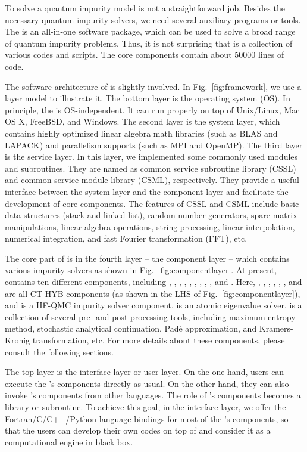 To solve a quantum impurity model is not a straightforward job. Besides the necessary quantum impurity solvers, we need several auxiliary programs or tools. The {\iqist} is an all-in-one software package, which can be used to solve a broad range of quantum impurity problems. Thus, it is not surprising that {\iqist} is a collection of various codes and scripts. The core components contain about 50000 lines of code. 

The software architecture of {\iqist} is slightly involved. In Fig.~\ref{fig:framework}, we use a layer model to illustrate it. The bottom layer is the operating system (OS). In principle, the {\iqist} is OS-independent. It can run properly on top of Unix/Linux, Mac OS X, FreeBSD, and Windows. The second layer is the system layer, which contains highly optimized linear algebra math libraries (such as BLAS and LAPACK) and parallelism supports (such as MPI and OpenMP). The third layer is the service layer. In this layer, we implemented some commonly used modules and subroutines. They are named as common service subroutine library (CSSL) and common service module library (CSML), respectively. They provide a useful interface between the system layer and the component layer and facilitate the development of core components. The features of CSSL and CSML include basic data structures (stack and linked list), random number generators, spare matrix manipulations, linear algebra operations, string processing, linear interpolation, numerical integration, and fast Fourier transformation (FFT), etc. 

The core part of {\iqist} is in the fourth layer -- the component layer -- which contains various impurity solvers as shown in Fig.~\ref{fig:componentlayer}. At present, {\iqist} contains ten different components, including {\azalea}, {\gardenia}, {\narcissus}, {\begonia}, {\lavender}, {\pansy}, {\manjushaka}, {\daisy}, {\jasmine}, and {\hibiscus}. Here, {\azalea}, {\gardenia}, {\narcissus}, {\begonia}, {\lavender}, {\pansy}, and {\manjushaka} are all CT-HYB components (as shown in the LHS of Fig.~\ref{fig:componentlayer}), and {\daisy} is a HF-QMC impurity solver component. {\jasmine} is an atomic eigenvalue solver. {\hibiscus} is a collection of several pre- and post-processing tools, including maximum entropy method, stochastic analytical continuation, Pad\'{e} approximation, and Kramers-Kronig transformation, etc. For more details about these components, please consult the following sections. 

The top layer is the interface layer or user layer. On the one hand, users can execute the {\iqist}'s components directly as usual. On the other hand, they can also invoke {\iqist}'s components from other languages. The role of {\iqist}'s components becomes a library or subroutine. To achieve this goal, in the interface layer, we offer the Fortran/C/C++/Python language bindings for most of the {\iqist}'s components, so that the users can develop their own codes on top of {\iqist} and consider it as a computational engine in black box.

